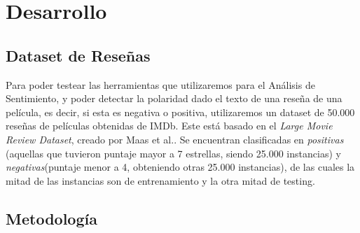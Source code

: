 \section{Desarrollo}

\subsection{Dataset de Reseñas}

Para poder testear las herramientas que utilizaremos para el Análisis de Sentimiento,
y poder detectar la polaridad dado el texto de una reseña de una película,
es decir, si esta es negativa o positiva, utilizaremos un
dataset de 50.000 reseñas de películas obtenidas de IMDb.
Este está basado en el \textit{Large Movie Review Dataset},
creado por Maas et al.\cite{Maas}.
Se encuentran clasificadas en \textit{positivas}
(aquellas que tuvieron puntaje mayor a 7 estrellas, siendo 25.000 instancias)
y \textit{negativas}(puntaje menor a 4, obteniendo otras 25.000 instancias),
de las cuales la mitad de las instancias son de entrenamiento y la otra mitad de testing.


\subsection{Metodología}

